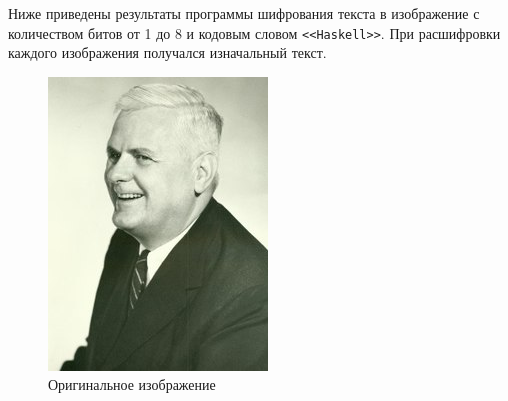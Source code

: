 \documentclass[10pt,a4paper,final]{article} %
\begin{document}
Ниже приведены результаты программы шифрования текста в изображение с количеством битов от 1 до 8 и кодовым словом \texttt{<<Haskell>>}. При расшифровки каждого изображения получался изначальный текст.

\begin{figure}[h!]
	\centering
	\begin{minipage}{0.3\textwidth}
		\centering
		\includegraphics[width=\linewidth]{img/Alonzo_Church}
		\caption{Оригинальное изображение}
	\end{minipage}
	\hspace{0.02\textwidth}
	\begin{minipage}{0.3\textwidth}
		\centering

\end{minipage}
\end{figure}
\end{document}
